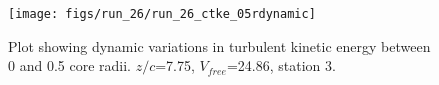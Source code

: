 \begin{figure}[H]
\centering
\texttt{[image: figs/run\_26/run\_26\_ctke\_05rdynamic]}
\caption{Plot showing dynamic variations in turbulent kinetic energy between 0 and 0.5 core radii. $z/c$=7.75, $V_{free}$=24.86, station 3.}
\label{fig:run_26_ctke_05rdynamic}
\end{figure}


